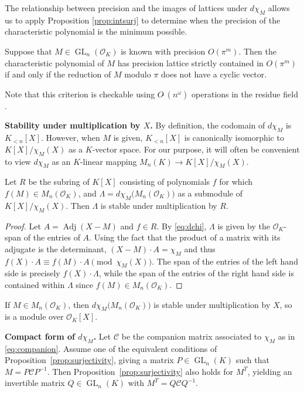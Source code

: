 \documentclass{sig-alternate-05-2015}
\DeclareMathOperator{\GL}{GL}
\DeclareMathOperator{\adj}{Adj}
\newcommand{\OK}{\mathcal{O}_K}
\newcommand{\softO}{O\tilde{~}}
\begin{document}
The relationship between precision and the images of lattices under $d\chi_M$ allows us to
apply Proposition \ref{prop:intsurj} to determine when the precision of the characteristic polynomial
is the minimum possible.

\begin{cor} \label{cor:prec_gain}
Suppose that $M \in \GL_n(\OK)$ is known with precision $O(\pi^m)$.
Then the characteristic polynomial of $M$ has precision lattice strictly contained in $O(\pi^m)$
if and only if the reduction of $M$ modulo $\pi$ does not have a cyclic vector.
\end{cor}

Note that this criterion is checkable using $\softO(n^\omega)$ operations in the residue field \cite{storjohann:01a}.

\medskip

\noindent
{\bf Stability under multiplication by $X$.}
By definition, the codomain of $d \chi_M$ is $K_{< n}[X]$. 
However, when $M$ is given, $K_{< n}[X]$ is canonically isomorphic
to $K[X]/\chi_M(X)$ as a $K$-vector space. For our purpose, it will 
often be convenient to view $d \chi_M$ as an $K$-linear mapping
$M_n(K) \to K[X]/\chi_M(X)$.

\begin{prop}
Let $R$ be the subring of $K[X]$ consisting of polynomials $f$ for
which $f(M) \in M_n(\OK)$, and $\Lambda = d \chi_M \big(M_n(\OK)\big)$
as a submodule of $K[X]/\chi_M(X)$.  Then $\Lambda$ is stable under 
multiplication by $R$.
\end{prop}
\begin{proof}
Let $A = \adj(X{-}M)$ and $f \in R$.  By \eqref{eq:dchi}, $\Lambda$ is given by
the $\OK$-span of the entries of $A$.   Using the fact that the product of a matrix
with its adjugate is the determinant, $(X{-}M) \cdot A = \chi_M$ and thus
$f(X) \cdot A \equiv f(M) \cdot A \pmod{\chi_M(X)}$.  The span of the entries
of the left hand side is precisely $f(X) \cdot \Lambda$, while the span of the entries
of the right hand side is contained within $\Lambda$ since $f(M) \in M_n(\OK)$.
\end{proof}

\begin{cor}
If $M \in M_n(\OK)$, then $d \chi_M \big(M_n(\OK)\big)$ 
is stable under multiplication by $X$, so is a module over $\OK[X]$.
\end{cor}

\medskip

\noindent
{\bf Compact form of $d \chi_M$.}
Let $\mathscr{C}$ be the companion matrix associated to $\chi_M$ as in \eqref{eq:companion}.
Assume one of the equivalent conditions of Proposition~\ref{prop:surjectivity}, giving a matrix 
$P \in \GL_n(K)$ such that $M = P \mathscr{C} P^{-1}$. Then Proposition~\ref{prop:surjectivity}
also holds for $M^T$, yielding an
invertible matrix $Q \in \GL_n(K)$ with $M^T = Q \mathscr{C} Q^{-1}$.
\end{document}
